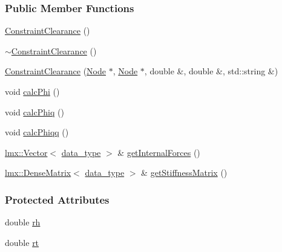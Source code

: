 \subsubsection*{Public Member Functions}
\begin{DoxyCompactItemize}
\item 
\hyperlink{classmknix_1_1_constraint_clearance_ad240e0d99967997aa4c2a5697aa4cb94}{Constraint\+Clearance} ()
\item 
\hyperlink{classmknix_1_1_constraint_clearance_a1db613ec74403b647fbeb68c91510c50}{$\sim$\+Constraint\+Clearance} ()
\item 
\hyperlink{classmknix_1_1_constraint_clearance_afcf63dc9c275d3ca6c55d072b2b554a2}{Constraint\+Clearance} (\hyperlink{classmknix_1_1_node}{Node} $\ast$, \hyperlink{classmknix_1_1_node}{Node} $\ast$, double \&, double \&, std\+::string \&)
\item 
void \hyperlink{classmknix_1_1_constraint_clearance_adeab95be15eee6fe28f09fafd4f5757a}{calc\+Phi} ()
\item 
void \hyperlink{classmknix_1_1_constraint_clearance_a7e834e62ef642f4f5207f3021f11020e}{calc\+Phiq} ()
\item 
void \hyperlink{classmknix_1_1_constraint_clearance_aea75fa1da7455bbefb5ce7705a16a3cc}{calc\+Phiqq} ()
\item 
\hyperlink{classlmx_1_1_vector}{lmx\+::\+Vector}$<$ \hyperlink{namespacemknix_a16be4b246fbf2cceb141e3a179111020}{data\+\_\+type} $>$ \& \hyperlink{classmknix_1_1_constraint_clearance_ac190c9f0a3b0851681c6be643cb385ac}{get\+Internal\+Forces} ()
\item 
\hyperlink{classlmx_1_1_dense_matrix}{lmx\+::\+Dense\+Matrix}$<$ \hyperlink{namespacemknix_a16be4b246fbf2cceb141e3a179111020}{data\+\_\+type} $>$ \& \hyperlink{classmknix_1_1_constraint_clearance_a40ac23ffea02a1a45e4b084bcd807a51}{get\+Stiffness\+Matrix} ()
\end{DoxyCompactItemize}
\subsubsection*{Protected Attributes}
\begin{DoxyCompactItemize}
\item 
double \hyperlink{classmknix_1_1_constraint_clearance_ad4bba99aa716d1f15bd9dc613f0352e8}{rh}
\item 
double \hyperlink{classmknix_1_1_constraint_clearance_a07e6a50d3416e2265e2dadb1bf730c43}{rt}
\end{DoxyCompactItemize}


